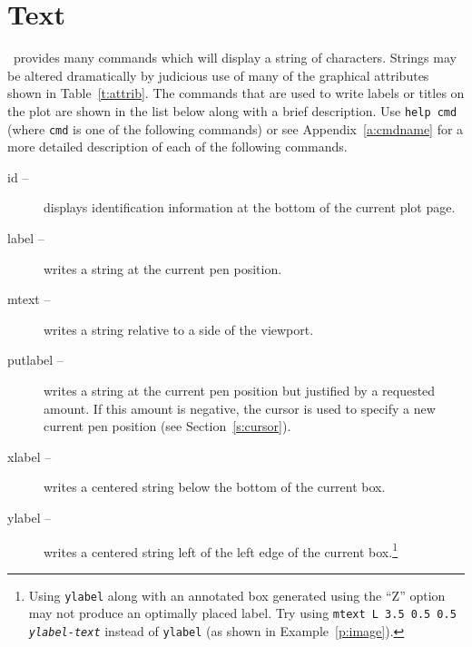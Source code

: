 \section{Text}

\wip\ provides many commands which will display a string of characters.
Strings may be altered dramatically by judicious use of many of the
graphical attributes shown in Table~\ref{t:attrib}.
The commands that are used to write labels or titles on the plot are
shown in the list below along with a brief description.
Use {\tt help cmd} (where {\tt cmd} is one of
the following commands) or see Appendix~\ref{a:cmdname}
for a more detailed description of each of the following commands.

\begin{description}
  \item [{id --}]
    displays identification information at the bottom of the current plot page.
  \item [{label --}]
    writes a string at the current pen position.
  \item [{mtext --}]
    writes a string relative to a side of the viewport.
  \item [{putlabel --}]
    writes a string at the current pen position but justified
    by a requested amount.  If this amount is negative,
    the cursor is used to
    specify a new current pen position (see Section~\ref{s:cursor}).
  \item [{xlabel --}]
    writes a centered string below the bottom of the current box.
  \item [{ylabel --}]
    writes a centered string left of the left edge of the current
    box.\footnote{Using {\tt ylabel} along with an annotated box generated
    using the ``Z'' option may not produce an optimally placed label.
    Try using
    {\tt mtext L 3.5 0.5 0.5 {\em ylabel-text}} instead of {\tt ylabel}
    (as shown in Example~\ref{p:image}).}
\end{description}

